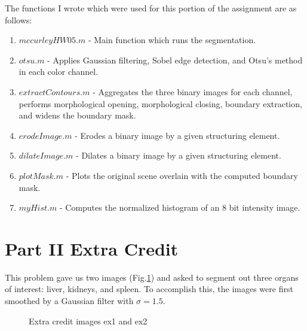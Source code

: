 \documentclass{article}[12 pt]
\begin{document}
\noindent
The functions I wrote which were used for this portion of the assignment are as follows:
\begin{enumerate}
\item $mccurleyHW05.m$ - Main function which runs the segmentation.
\item $otsu.m$ - Applies Gaussian filtering, Sobel edge detection, and Otsu's method in each color channel.
\item $extractContours.m$ - Aggregates the three binary images for each channel, performs morphological opening, morphological closing, boundary extraction, and widens the boundary mask.
\item $erodeImage.m$ - Erodes a binary image by a given structuring element.
\item $dilateImage.m$ - Dilates a binary image by a given structuring element. 
\item $plotMask.m$ - Plots the original scene overlain with the computed boundary mask.
\item $myHist.m$ - Computes the normalized histogram of an 8 bit intensity image.
\end{enumerate} 



\section*{Part II Extra Credit}
This problem gave us two images (Fig.\ref{ex}) and asked to segment out three organs of interest: liver, kidneys, and spleen.  To accomplish this, the images were first smoothed by a Gaussian filter with $\sigma = 1.5$. 

\begin{figure}[H]
\captionsetup[subfloat]{labelformat=empty}
\centering
{} 
\caption{Extra credit images ex1 and ex2}
\label{ex}
\end{figure}
\end{document}
